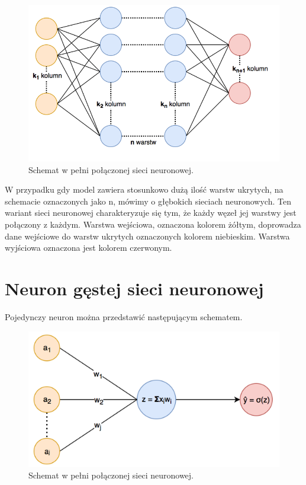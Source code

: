 \begin{figure}[ht]
\centerline{\includegraphics[scale=0.9]{resources/schemat_fc.png}}
\caption{Schemat w pełni połączonej sieci neuronowej.}
\label{fig:schematFc}
\end{figure}

W przypadku gdy model zawiera stosunkowo dużą ilość warstw ukrytych, na schemacie oznaczonych jako n, mówimy o głębokich sieciach neuronowych. 
Ten wariant sieci neuronowej charakteryzuje się tym, że każdy węzeł jej warstwy jest połączony z każdym. Warstwa wejściowa, oznaczona kolorem żółtym, doprowadza dane wejściowe do warstw ukrytych oznaczonych kolorem niebieskim. Warstwa wyjściowa oznaczona jest kolorem czerwonym.

\section{Neuron gęstej sieci neuronowej}
Pojedynczy neuron można przedstawić następującym schematem.

\begin{figure}[ht]
\centerline{\includegraphics[scale=1]{resources/neuron_fc.png}}
\caption{Schemat w pełni połączonej sieci neuronowej.}
\label{fig:neuronFc}
\end{figure}


